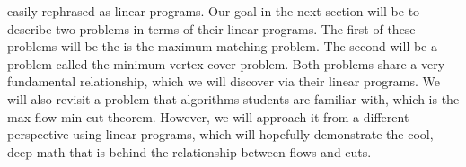 	easily rephrased as linear programs. Our goal in the next section will be to describe two 
	problems in terms of their linear programs. The first of these problems will be the is the 
	maximum matching problem. The second will be a problem called the minimum vertex 
	cover problem. Both problems share a very fundamental relationship, which we will discover 
	via their linear programs. We will also revisit a problem that algorithms students are familiar
	with, which is the max-flow min-cut theorem. However, we will approach it from a different 
	perspective using linear programs, which will hopefully demonstrate the cool, deep math 
	that is behind the relationship between flows and cuts.
